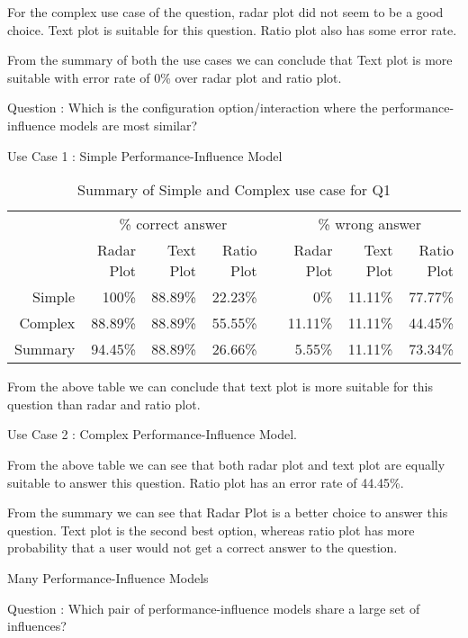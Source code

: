For the complex use case of the question, radar plot did not seem to be a good choice. Text plot is suitable for this question. Ratio plot also has some error rate.



From the summary of both the use cases we can conclude that Text plot is more suitable with error rate of 0\% over radar plot and ratio plot.

Question : Which is the configuration option/interaction where the performance-influence models are most similar?

Use Case 1 : Simple Performance-Influence Model

\begin{table*}[htbp]
\begin{tabular}{@{}rrrrcrrr@{}}\toprule
    & \multicolumn{3}{c}{\% correct answer} & \phantom{abc}& \multicolumn{3}{c}{\% wrong answer} \\
\cmidrule{2-4} \cmidrule{6-8} \cmidrule{10-12}
& Radar Plot & Text Plot & Ratio Plot && Radar Plot & Text Plot & Ratio Plot \\ \midrule
Simple & 100\% & 88.89\% & 22.23\% && 0\% & 11.11\% & 77.77\% \\
Complex & 88.89\% & 88.89\% & 55.55\% && 11.11\% & 11.11\% & 44.45\%\\
\toprule
Summary & 94.45\% & 88.89\% & 26.66\% && 5.55\% & 11.11\% & 73.34\%\\
\bottomrule
\end{tabular}
\caption{Summary of Simple and Complex use case for Q1}
\end{table*}


From the above table we can conclude that text plot is more suitable for this question than radar and ratio plot.

Use Case 2 : Complex Performance-Influence Model.


From the above table we can see that both radar plot and text plot are equally suitable to answer this question. Ratio plot has an error rate of 44.45\%.

From the summary we can see that Radar Plot is a better choice to answer this question. Text plot is the second best option, whereas ratio plot has more probability that a user would not get a correct answer to the question.

Many Performance-Influence Models

Question : Which pair of performance-influence models share a large set of influences?

